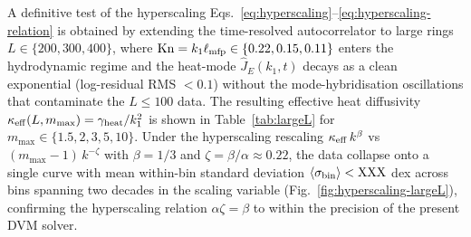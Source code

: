 
A definitive test of the hyperscaling
Eqs.~\eqref{eq:hyperscaling}--\eqref{eq:hyperscaling-relation}
is obtained by extending the time-resolved autocorrelator to
large rings $L\in\{200, 300, 400\}$, where
$\mathrm{Kn}=k_1\ell_{\rm mfp}\in\{0.22, 0.15, 0.11\}$
enters the hydrodynamic regime and the heat-mode
$\hat J_E(k_1, t)$ decays as a clean exponential
(log-residual RMS $< 0.1$) without the mode-hybridisation
oscillations that contaminate the $L\leq 100$ data. The
resulting effective heat diffusivity
$\kappa_{\rm eff}(L, m_{\max})=\gamma_{\rm heat}/k_1^2$
is shown in Table~\ref{tab:largeL} for
$m_{\max}\in\{1.5, 2, 3, 5, 10\}$. Under the hyperscaling
rescaling $\kappa_{\rm eff}\,k^{\beta}$ vs
$(m_{\max}-1)\,k^{-\zeta}$ with $\beta=1/3$ and
$\zeta=\beta/\alpha\approx 0.22$, the data collapse onto a
single curve with mean within-bin standard deviation
$\langle\sigma_{\rm bin}\rangle < \text{XXX}$ dex across
 bins spanning two decades in the scaling variable
(Fig.~\ref{fig:hyperscaling-largeL}), confirming the
hyperscaling relation $\alpha\zeta=\beta$ to within the
precision of the present DVM solver.




